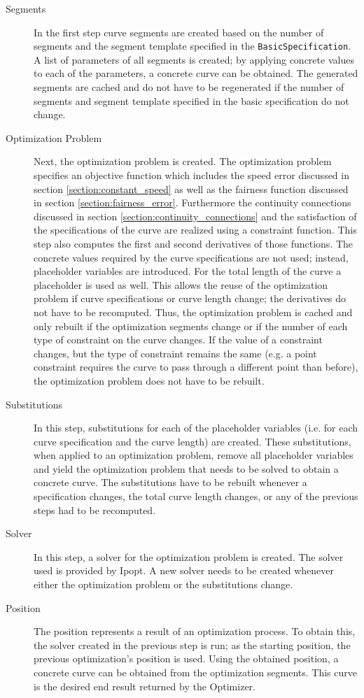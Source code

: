 \documentclass[a4paper]{article}
\begin{document}
					\begin{description}
						\item[Segments]
						In the first step curve segments are created based on the number of segments and the segment template specified in the \verb|BasicSpecification|. A list of parameters of all segments is created; by applying concrete values to each of the parameters, a concrete curve can be obtained. The generated segments are cached and do not have to be regenerated if the number of segments and segment template specified in the basic specification do not change.
						
						\item[Optimization Problem]
						Next, the optimization problem is created. The optimization problem specifies an objective function which includes the speed error discussed in section \ref{section:constant_speed} as well as the fairness function discussed in section \ref{section:fairness_error}. Furthermore the continuity connections discussed in section \ref{section:continuity_connections} and the satisfaction of the specifications of the curve are realized using a constraint function. This step also computes the first and second derivatives of those functions. The concrete values required by the curve specifications are not used; instead, placeholder variables are introduced. For the total length of the curve a placeholder is used as well. This allows the reuse of the optimization problem if curve specifications or curve length change; the derivatives do not have to be recomputed. Thus, the optimization problem is cached and only rebuilt if the optimization segments change or if the number of each type of constraint on the curve changes. If the value of a constraint changes, but the type of constraint remains the same (e.g. a point constraint requires the curve to pass through a different point than before), the optimization problem does not have to be rebuilt.
						
						\item[Substitutions]
						In this step, substitutions for each of the placeholder variables (i.e. for each curve specification and the curve length) are created. These substitutions, when applied to an optimization problem, remove all placeholder variables and yield the optimization problem that needs to be solved to obtain a concrete curve. The substitutions have to be rebuilt whenever a specification changes, the total curve length changes, or any of the previous steps had to be recomputed.
						
						\item[Solver]
						In this step, a solver for the optimization problem is created. The solver used is provided by Ipopt. A new solver needs to be created whenever either the optimization problem or the substitutions change.
						\item[Position]
							The position represents a result of an optimization process. To obtain this, the solver created in the previous step is run; as the starting position, the previous optimization's position is used. Using the obtained position, a concrete curve can be obtained from the optimization segments. This curve is the desired end result returned by the Optimizer.
					\end{description}
\end{document}

